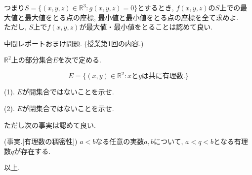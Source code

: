 \documentclass[dvipdfmx,a4paper,11pt]{article}
\newcommand{\R}{\mathbb{R}}
\theoremstyle{definition}
\newcommand{\pdrv}[2]{\frac{\partial #1}{\partial #2}}
\begin{document}
    \vspace{-11pt}
    
つまり$S = \{ (x,y,z) \in \R^3: g(x,y,z)=0\}$とするとき, 
$f(x,y,z)$の$S$上での最大値と最大値をとる点の座標, 最小値と最小値をとる点の座標を全て求めよ.　\\

   \vspace{-11pt}
 ただし, $S$上で$f(x,y,z)$が最大値・最小値をとることは認めて良い.
 
 \newpage 
 
{\Large 中間レポートおまけ問題.} (授業第1回の内容.)
\vspace{11pt}

$\R^2$上の部分集合$E$を次で定める.

$$
E = \{ (x,y) \in \R^2 : \text{$x$と$y$は共に有理数.}\}
$$

(1).
$E$が開集合ではないことを示せ.
 
(2).
$E$が閉集合ではないことを示せ.
    \vspace{11pt}


ただし次の事実は認めて良い.

(事実.[有理数の稠密性])
$a<b$なる任意の実数$a,b$について, $a<q<b$となる有理数$q$が存在する.

     \vspace{33pt} 
     
 \begin{flushright}
 {\LARGE 以上.}
 \end{flushright}




  

 
\end{document}
